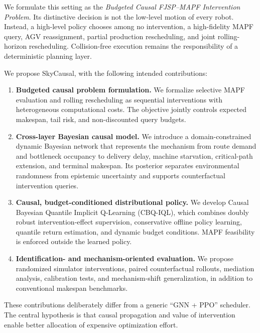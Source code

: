 \documentclass[11pt,a4paper]{article}
\newcommand{\method}{SkyCausal}
\newcommand{\algo}{CBQ-IQL}
\begin{document}
We formulate this setting as the \emph{Budgeted Causal FJSP--MAPF
Intervention Problem}. Its distinctive decision is not the low-level motion of
every robot. Instead, a high-level policy chooses among no intervention, a
high-fidelity MAPF query, AGV reassignment, partial production rescheduling, and
joint rolling-horizon rescheduling. Collision-free execution remains the
responsibility of a deterministic planning layer.

We propose \method, with the following intended contributions:

\begin{enumerate}[leftmargin=*]
    \item \textbf{Budgeted causal problem formulation.}
    We formalize selective MAPF evaluation and rolling rescheduling as
    sequential interventions with heterogeneous computational costs. The
    objective jointly controls expected makespan, tail risk, and non-discounted
    query budgets.

    \item \textbf{Cross-layer Bayesian causal model.}
    We introduce a domain-constrained dynamic Bayesian network that represents
    the mechanism from route demand and bottleneck occupancy to delivery delay,
    machine starvation, critical-path extension, and terminal makespan. Its
    posterior separates environmental randomness from epistemic uncertainty and
    supports counterfactual intervention queries.

    \item \textbf{Causal, budget-conditioned distributional policy.}
    We develop Causal Bayesian Quantile Implicit Q-Learning (\algo), which
    combines doubly robust intervention-effect supervision, conservative offline
    policy learning, quantile return estimation, and dynamic budget conditions.
    MAPF feasibility is enforced outside the learned policy.

    \item \textbf{Identification- and mechanism-oriented evaluation.}
    We propose randomized simulator interventions, paired counterfactual
    rollouts, mediation analysis, calibration tests, and mechanism-shift
    generalization, in addition to conventional makespan benchmarks.
\end{enumerate}

These contributions deliberately differ from a generic ``GNN + PPO'' scheduler.
The central hypothesis is that causal propagation and value of intervention
enable better allocation of expensive optimization effort.
\end{document}
